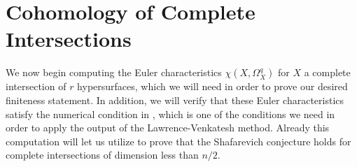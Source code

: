 \documentclass{article}
\theoremstyle{definition}
\theoremstyle{remark}
\begin{document}
\section{Cohomology of Complete Intersections}\label{section: cohomology computation}
We now begin computing the Euler characteristics $\chi(X, \Omega^q_X)$ for $X$ a complete intersection of $r$ hypersurfaces, which we will need in order to prove our desired finiteness statement. In addition, we will verify that these Euler characteristics satisfy the numerical condition in \cite[Theorem D]{km24}, which is one of the conditions we need in order to apply the output of the Lawrence-Venkatesh method. Already this computation will let us utilize \cite[Theorem D]{km24} to prove that the Shafarevich conjecture holds for complete intersections of dimension less than $n/2.$
\end{document}
